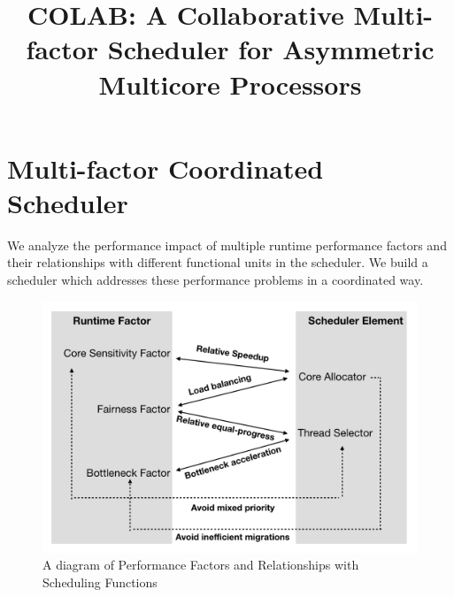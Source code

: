\documentclass[10pt,conference]{IEEEtran}
\begin{document}
\title{COLAB: A Collaborative Multi-factor Scheduler for Asymmetric Multicore Processors
}


\maketitle







\section{Multi-factor Coordinated Scheduler}
We analyze the performance impact of multiple runtime performance factors and their relationships with different functional units in the scheduler. We build a scheduler which addresses these performance problems in a coordinated way.

\begin{figure}
\centering
\includegraphics[scale=0.45]{figures/mfa.pdf}
\caption{A diagram of Performance Factors and Relationships with Scheduling Functions}
\label{figure:f1}
\end{figure} 
\end{document}
